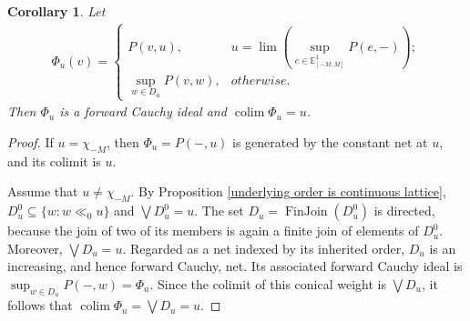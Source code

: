 \documentclass[preprint,3p,times]{elsarticle}
\theoremstyle{plain}
\newtheorem{cor}[thm]{Corollary}
\theoremstyle{definition}
\numberwithin{equation}{section}
\begin{document}
\begin{cor}
	Let 
	\begin{align*}
		\Phi_u(v)=\begin{cases}
			P(v,u), & u= \operatorname{lim} (\sup_{e\in\mathbb{E}^1_{[-M,M]}} P(e,-) ); \\
			\sup_{w\in D_u}  P(v,w), & otherwise.
		\end{cases} 
	\end{align*}
	Then \(\Phi_u\) is a forward Cauchy ideal and  \(\operatorname{colim}\Phi_u=u \).
\end{cor}
\begin{proof}
If \(u=\chi_{-M}\), then \(\Phi_u=P(-,u)\) is generated by the
constant net at \(u\), and its colimit is \(u\).

Assume that \(u\ne\chi_{-M}\). By Proposition
\ref{underlying order is continuous lattice},
\(D_u^0\subseteq\{w:w\ll_0u\}\) and \(\bigvee D_u^0=u\).
The set \(D_u=\operatorname{FinJoin}(D_u^0)\) is directed,
because the join of two of its members is again a finite join
of elements of \(D_u^0\). Moreover, \(\bigvee D_u=u\).
Regarded as a net indexed by its inherited order, \(D_u\) is an
increasing, and hence forward Cauchy, net. Its associated
forward Cauchy ideal is \(\sup_{w\in D_u}P(-,w)=\Phi_u\).
Since the colimit of this conical weight is \(\bigvee D_u\), it
follows that \(\operatorname{colim}\Phi_u=\bigvee D_u=u\).
\end{proof}
\end{document}
